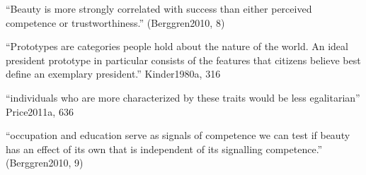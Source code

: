 		``Beauty is more strongly correlated with success than either perceived competence or trustworthiness.'' (Berggren2010, 8)

		``Prototypes are categories people hold about the nature of the world. An ideal president prototype in particular consists of the features that citizens believe best define an exemplary president.'' Kinder1980a, 316





``individuals who are more characterized by these traits would be less egalitarian'' Price2011a, 636



``occupation and education serve as signals of competence we can test if beauty has an effect of its own that is independent of its signalling competence.'' (Berggren2010, 9)





	














